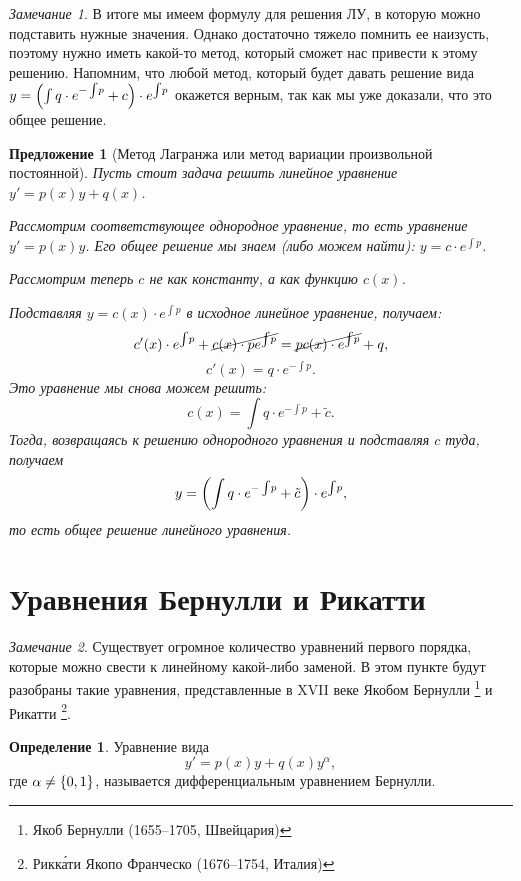 \documentclass[a5paper, 10pt]{article}
\theoremstyle{definition}
\newtheorem{Def}{Определение}
\theoremstyle{plain}
\newtheorem*{Prop}{Предложение}
\theoremstyle{remark}
\newtheorem*{Note}{Замечание}
\begin{document}
	\begin{Note}
		В итоге мы имеем формулу для решения ЛУ, в которую можно подставить нужные значения. Однако достаточно тяжело помнить ее наизусть, поэтому нужно иметь какой-то метод, который сможет нас привести к этому решению. Напомним, что любой метод, который будет давать решение вида $	y = \left(\int q \cdot e^{-\int\!p} + c\right) \cdot e^{\int \! p}$ окажется верным, так как мы уже доказали, что это общее решение. 
	\end{Note}

	\begin{Prop}[Метод Лагранжа или метод вариации произвольной постоянной]
		Пусть стоит задача решить линейное уравнение $y'=p(x)y+q(x)$.
		
		Рассмотрим соответствующее однородное уравнение, то есть уравнение $y'=p(x)y$. Его общее решение мы знаем (либо можем найти): $y=c\cdot e^{\int\!p}$. 
		
		Рассмотрим теперь $c$ не как константу, а как функцию $c(x)$.
		
		Подставляя $y=c(x) \cdot e^{\int\!p}$ в исходное линейное уравнение, получаем:
		\[
		c'(x) \cdot e^{\int\!p} + \cancel{c(x) \cdot p e^{\int\!p}} = \cancel{p c(x) \cdot e^{\int\!p}} + q,
		\]
		\[
		c'(x) = q\cdot e^{-\int\!p}.
		\]
		Это уравнение мы снова можем решить:
		\[
		c(x) = \int q\cdot e^{-\int\!p} + \tilde{c}.
		\]
		Тогда, возвращаясь к решению однородного уравнения и подставляя $c$ туда, получаем
		\[
		y = \left(\int q\cdot e^{-\int\!p} + \tilde{c}\right)\cdot e^{\int\!p},
		\]
		то есть общее решение линейного уравнения.
	\end{Prop}

	\section[Бернулли и Рикатти]{Уравнения Бернулли и Рикатти}
	\begin{Note}
		Существует огромное количество уравнений первого порядка, которые можно свести к линейному какой-либо заменой. В этом пункте будут разобраны такие уравнения, представленные в XVII веке Якобом Бернулли \footnote{Якоб Бернулли (1655--1705, Швейцария)} и Рикатти \footnote{Рикк\'{а}ти Якопо Франческо (1676--1754, Италия)}.
	\end{Note}
	
	\begin{Def}
		Уравнение вида 
		\begin{equation}
			y' = p(x) y + q(x) y^{\alpha},
		\end{equation}
		где $\alpha\neq \left\{0,1\right\}$, называется дифференциальным уравнением Бернулли.
	\end{Def}
	
\end{document}
